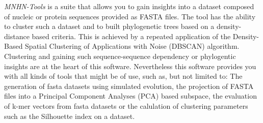 \emph{MNHN-Tools} is a suite that allows you to gain insights
into a dataset composed of nucleic or protein sequences provided as
FASTA \cite{fasta} files. The tool has the ability to cluster such a
dataset and to built phylogenetic trees based on a density- distance
based criteria. This is achieved by a repeated application of the
Density-Based Spatial Clustering of Applications with Noise (DBSCAN)
\cite{dbscan} algorithm. Clustering and gaining such sequence-sequence
dependency or phylogentic insights are at the heart of this
software. Nevertheless this software provides you with all kinds of
tools that might be of use, such as, but not limited to: The
generation of fasta datasets using simulated evolution, the projection
of FASTA files into a Principal Component Analyses (PCA) based subspace, the
evaluation of k-mer vectors from fasta datasets or the calulation of
clustering parameters such as the Silhouette \cite{silhouette}
index on a dataset.
